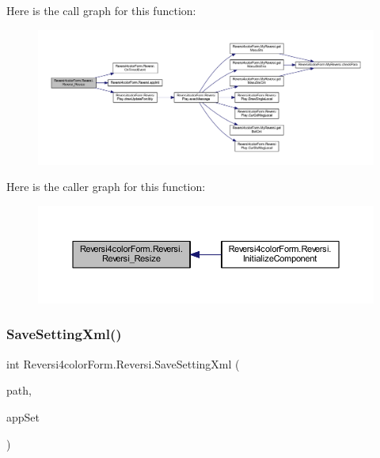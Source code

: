 Here is the call graph for this function\+:\nopagebreak
\begin{figure}[H]
\begin{center}
\leavevmode
\includegraphics[width=350pt]{class_reversi4color_form_1_1_reversi_afacffb0f4d383892677acfd1b7304606_cgraph}
\end{center}
\end{figure}
Here is the caller graph for this function\+:\nopagebreak
\begin{figure}[H]
\begin{center}
\leavevmode
\includegraphics[width=350pt]{class_reversi4color_form_1_1_reversi_afacffb0f4d383892677acfd1b7304606_icgraph}
\end{center}
\end{figure}
\mbox{\label{class_reversi4color_form_1_1_reversi_aff9f10404fc96f56154073d324d4dea2}} 
\subsubsection{\texorpdfstring{Save\+Setting\+Xml()}{SaveSettingXml()}}
{\footnotesize\ttfamily int Reversi4color\+Form.\+Reversi.\+Save\+Setting\+Xml (\begin{DoxyParamCaption}\item[{string}]{path,  }\item[{ref \hyperlink{class_reversi4color_form_1_1_reversi_setting}{Reversi\+Setting}}]{app\+Set }\end{DoxyParamCaption})}




